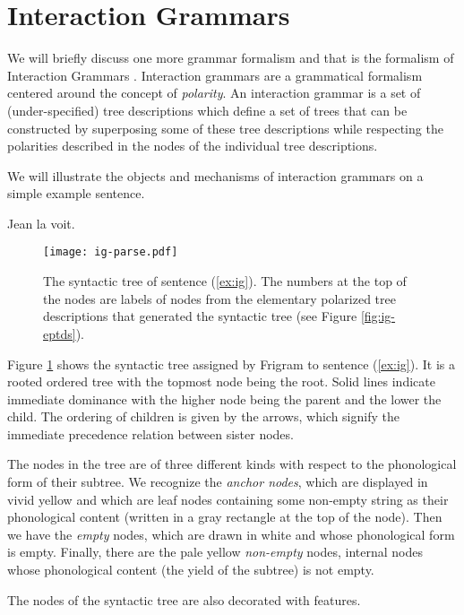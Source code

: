 \section{Interaction Grammars}

We will briefly discuss one more grammar formalism and that is the
formalism of Interaction Grammars \cite{guillaume2009interaction}.
Interaction grammars are a grammatical formalism centered around the
concept of \emph{polarity}. An interaction grammar is a set of
(under-specified) tree descriptions which define a set of trees that can
be constructed by superposing some of these tree descriptions while
respecting the polarities described in the nodes of the individual tree
descriptions.

We will illustrate the objects and mechanisms of interaction grammars on
a simple example sentence.

\begin{exe}
  \ex \label{ex:ig} Jean la voit.
\end{exe}

\begin{figure}
  \centering
  \texttt{[image: ig-parse.pdf]}
  \caption{\label{fig:ig-parse} The syntactic tree of sentence
    (\ref{ex:ig}). The numbers at the top of the nodes are labels of
    nodes from the elementary polarized tree descriptions that generated
    the syntactic tree (see Figure \ref{fig:ig-eptds}).}
\end{figure}

Figure \ref{fig:ig-parse} shows the syntactic tree assigned by Frigram
to sentence (\ref{ex:ig}). It is a rooted ordered tree with the topmost
node being the root. Solid lines indicate immediate dominance with the
higher node being the parent and the lower the child. The ordering of
children is given by the arrows, which signify the immediate precedence
relation between sister nodes.

The nodes in the tree are of three different kinds with respect to the
phonological form of their subtree. We recognize the \emph{anchor
  nodes}, which are displayed in vivid yellow and which are leaf nodes
containing some non-empty string as their phonological content (written
in a gray rectangle at the top of the node). Then we have the
\emph{empty} nodes, which are drawn in white and whose phonological form
is empty. Finally, there are the pale yellow \emph{non-empty} nodes,
internal nodes whose phonological content (the yield of the subtree) is
not empty.

The nodes of the syntactic tree are also decorated with features.

